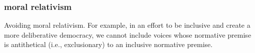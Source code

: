 \begin{frame}
    \frametitle{moral relativism}

    Avoiding moral relativism. For example, in an effort to be inclusive and create a more deliberative democracy,
    we cannot include voices whose normative premise is antithetical (i.e., exclusionary) to an inclusive normative
    premise.

\end{frame}
